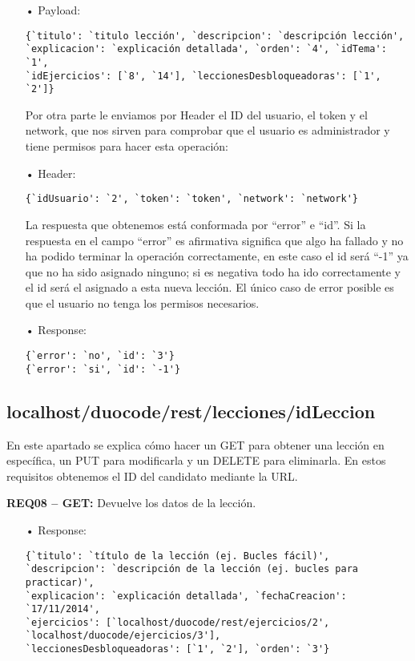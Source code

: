 \begin{itemize}
\item[•]Payload: 
{\codesize
\begin{verbatim}
{`titulo': `titulo lección', `descripcion': `descripción lección', 
`explicacion': `explicación detallada', `orden': `4', `idTema': `1', 
`idEjercicios': [`8', `14'], `leccionesDesbloqueadoras': [`1', `2']}
\end{verbatim}
}

Por otra parte le enviamos por Header el ID del usuario, el token y el network, que nos sirven para comprobar que el usuario es administrador y tiene permisos para hacer esta operación:
\item[•]Header: 
{\codesize
\begin{verbatim}
{`idUsuario': `2', `token': `token', `network': `network'}
\end{verbatim}
}

La respuesta que obtenemos está conformada por ``error'' e ``id''. Si la respuesta en el campo ``error'' es afirmativa significa que algo ha fallado y no ha podido terminar la operación correctamente, en este caso el id será ``-1'' ya que no ha sido asignado ninguno; si es negativa todo ha ido correctamente y el id será el asignado a esta nueva lección. El único caso de error posible es que el usuario no tenga los permisos necesarios.
\item[•]Response: 
{\codesize
\begin{verbatim}
{`error': `no', `id': `3'}
{`error': `si', `id': `-1'}
\end{verbatim}
}
\end{itemize}

\subsection{localhost/duocode/rest/lecciones/idLeccion}
En este apartado se explica cómo hacer un GET para obtener una lección en específica, un PUT para modificarla y un DELETE para eliminarla.
En estos requisitos obtenemos el ID del candidato mediante la URL.
\vspace{1em}


\textbf{REQ08 – GET:} Devuelve los datos de la lección.

\begin{itemize}
\item[•]Response:
{\codesize
\begin{verbatim}
{`titulo': `título de la lección (ej. Bucles fácil)', 
`descripcion': `descripción de la lección (ej. bucles para practicar)', 
`explicacion': `explicación detallada', `fechaCreacion': `17/11/2014',
`ejercicios': [`localhost/duocode/rest/ejercicios/2', 
`localhost/duocode/ejercicios/3'], 
`leccionesDesbloqueadoras': [`1', `2'], `orden': `3'}
\end{verbatim}
}
\end{itemize}

